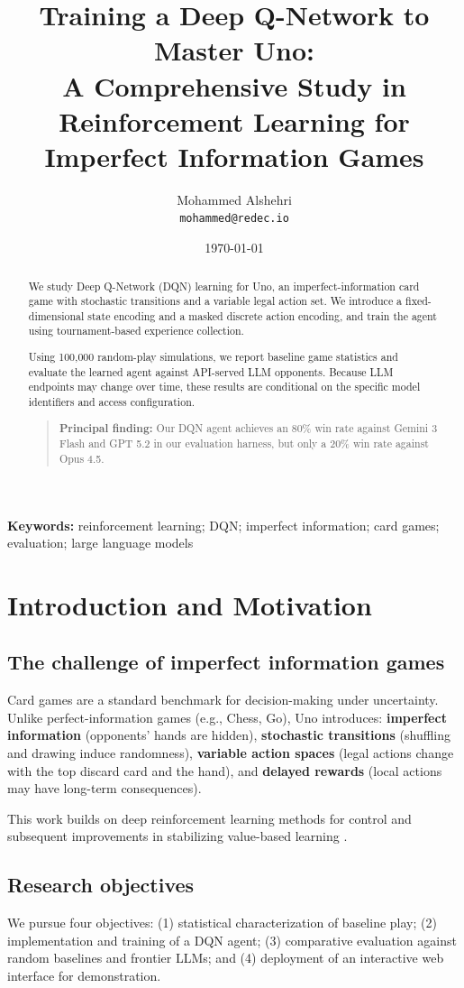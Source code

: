 \documentclass[11pt]{article}
\title{Training a Deep Q-Network to Master Uno: \\ A Comprehensive Study in Reinforcement Learning for Imperfect Information Games}
\author{Mohammed Alshehri \\ \texttt{mohammed@redec.io}}
\date{\today}
\begin{document}
\maketitle

\begin{abstract}
We study Deep Q-Network (DQN) learning for Uno, an imperfect-information card game with stochastic transitions and a variable legal action set. We introduce a fixed-dimensional state encoding and a masked discrete action encoding, and train the agent using tournament-based experience collection.

Using 100{,}000 random-play simulations, we report baseline game statistics and evaluate the learned agent against API-served LLM opponents. Because LLM endpoints may change over time, these results are conditional on the specific model identifiers and access configuration.

\begin{quote}
\textbf{Principal finding:} Our DQN agent achieves an 80\% win rate against Gemini 3 Flash and GPT 5.2 in our evaluation harness, but only a 20\% win rate against Opus 4.5.
\end{quote}
\end{abstract}

\textbf{Keywords:} reinforcement learning; DQN; imperfect information; card games; evaluation; large language models

\section{Introduction and Motivation}
\subsection{The challenge of imperfect information games}
Card games are a standard benchmark for decision-making under uncertainty. Unlike perfect-information games (e.g., Chess, Go), Uno introduces: \textbf{imperfect information} (opponents' hands are hidden), \textbf{stochastic transitions} (shuffling and drawing induce randomness), \textbf{variable action spaces} (legal actions change with the top discard card and the hand), and \textbf{delayed rewards} (local actions may have long-term consequences).

This work builds on deep reinforcement learning methods for control \parencite{mnih2015human} and subsequent improvements in stabilizing value-based learning \parencite{vanhasselt2016double}.

\subsection{Research objectives}
We pursue four objectives: (1) statistical characterization of baseline play; (2) implementation and training of a DQN agent; (3) comparative evaluation against random baselines and frontier LLMs; and (4) deployment of an interactive web interface for demonstration.
\end{document}
